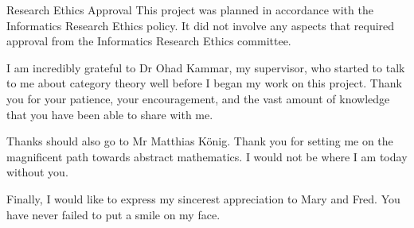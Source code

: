 \documentclass[bsc,singlespacing,parskip,logo]{infthesis}
\begin{document}
\begin{preliminary}
  \maketitle

  \newenvironment{ethics}
  {\begin{frontenv}{Research Ethics Approval}{\LARGE}}
  {\end{frontenv}\newpage}

  \begin{ethics}
    This project was planned in accordance with the Informatics Research
    Ethics policy. It did not involve any aspects that required approval
    from the Informatics Research Ethics committee.

    \standarddeclaration
  \end{ethics}


  \begin{acknowledgements}
    I am incredibly grateful to Dr Ohad Kammar, my supervisor, who started to
    talk to me about category theory well before I began my work on this
    project. Thank you for your patience, your encouragement, and the vast
    amount of knowledge that you have been able to share with me.

    Thanks should also go to Mr Matthias K\"onig. Thank you for setting me on
    the magnificent path towards abstract mathematics. I would not be where I am
    today without you.

    Finally, I would like to express my sincerest appreciation to Mary
    and Fred. You have never failed to put a smile on my face.
  \end{acknowledgements}


  \tableofcontents
\end{preliminary}















%
\end{document}
